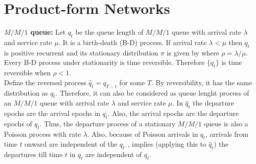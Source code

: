 \documentclass[all-lectures.tex]{subfiles}
\begin{document}

\setcounter{section}{4}
\setcounter{subsection}{1}

\section*{}
\section{Product-form Networks}
\textbf{$M/M/1$ queue:}
Let $q_t$ be the queue length of $M/M/1$ queue with arrival rate $\lambda$ and service rate $\mu$. It is a birth-death (B-D) process. 
If arrival rate $\lambda < \mu$ then $q_t$ is positive recurrent and its stationary distribution  $\pi$ is given by
where  $\rho = \lambda/\mu$. Every B-D process under stationarity is time reversible. Therefore $\{q_t\}$ is time reversible when $\rho<1$. \\
\indent Define the reversed process $\hat{q}_t = q_{T-t}$ for some $T$. By reversibility, it has the same distribution as $q_t$. Therefore, it can also be considered as queue lenght process of an $M/M/1$ queue with arrival rate $\lambda$ and service rate $\mu$. In $\hat{q}_t$ the departure epochs are the arrival epochs in $q_t$. Also, the arrival epochs are the departure epochs of $q_t$.
Thus, the departure process of a stationary $M/M/1$ queue is also a Poisson process with rate $\lambda$. Also, because of Poisson arrivals in $q_t$, arrivals from time $t$ onward are independent of the $q_{t^-}$, implies (applying this to $\hat{q}_t$) the departures till time $t$ in $q_t$ are independent of $q_t$.
\end{document}
